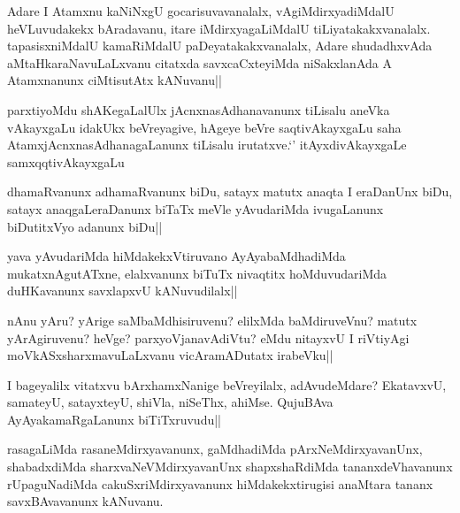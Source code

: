 \begin{artha}
Adare I Atamxnu kaNiNxgU gocarisuvavanalalx, vAgiMdirxyadiMdalU heVLuvudakekx bAradavanu, itare iMdirxyagaLiMdalU tiLiyatakakxvanalalx. tapasisxniMdalU kamaRiMdalU paDeyatakakxvanalalx, Adare shudadhxvAda aMtaHkaraNavuLaLxvanu citatxda savxcaCxteyiMda niSakxlanAda A Atamxnanunx ciMtisutAtx kANuvanu||
\end{artha}

\begin{artha}
parxtiyoMdu shAKegaLalUlx jAcnxnasAdhanavanunx tiLisalu aneVka vAkayxgaLu idakUkx beVreyagive, hAgeye beVre saqtivAkayxgaLu saha AtamxjAcnxnasAdhanagaLanunx tiLisalu irutatxve.`\stext'  itAyxdivAkayxgaLe samxqqtivAkayxgaLu
\end{artha}


\begin{artha}
dhamaRvanunx adhamaRvanunx biDu, satayx matutx anaqta I eraDanUnx biDu, satayx anaqgaLeraDanunx biTaTx meVle yAvudariMda ivugaLanunx biDutitxVyo adanunx biDu||
\end{artha}

\begin{artha}
yava yAvudariMda hiMdakekxVtiruvano AyAyabaMdhadiMda mukatxnAgutATxne, elalxvanunx biTuTx nivaqtitx hoMduvudariMda duHKavanunx savxlapxvU kANuvudilalx||
\end{artha}

\begin{artha}
nAnu yAru? yArige saMbaMdhisiruvenu? elilxMda baMdiruveVnu? matutx yArAgiruvenu? heVge? parxyoVjanavAdiVtu? eMdu nitayxvU I riVtiyAgi moVkASxsharxmavuLaLxvanu vicAramADutatx irabeVku||
\end{artha}


\begin{artha}
I bageyalilx vitatxvu bArxhamxNanige beVreyilalx, adAvudeMdare? EkatavxvU, samateyU, satayxteyU, shiVla, niSeThx, ahiMse. QujuBAva AyAyakamaRgaLanunx biTiTxruvudu||
\end{artha}

\begin{artha}
rasagaLiMda rasaneMdirxyavanunx, gaMdhadiMda pArxNeMdirxyavanUnx, shabadxdiMda sharxvaNeVMdirxyavanUnx shapxshaRdiMda tananxdeVhavanunx rUpaguNadiMda cakuSxriMdirxyavanunx hiMdakekxtirugisi anaMtara tananx savxBAvavanunx kANuvanu.
\end{artha}

